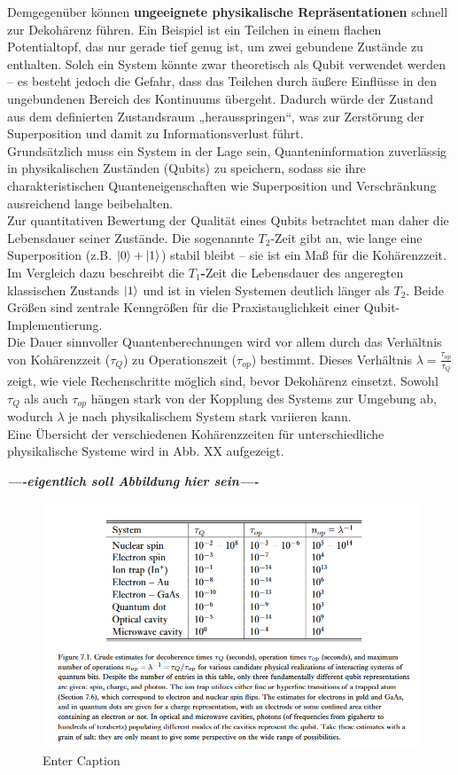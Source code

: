 Demgegenüber können \textbf{ungeeignete physikalische Repräsentationen} schnell zur Dekohärenz führen. Ein Beispiel ist ein Teilchen in einem flachen Potentialtopf, das nur gerade tief genug ist, um zwei gebundene Zustände zu enthalten. Solch ein System könnte zwar theoretisch als Qubit verwendet werden – es besteht jedoch die Gefahr, dass das Teilchen durch äußere Einflüsse in den ungebundenen Bereich des Kontinuums übergeht. Dadurch würde der Zustand aus dem definierten Zustandsraum „herausspringen“, was zur Zerstörung der Superposition und damit zu Informationsverlust führt.\\

Grundsätzlich muss ein System in der Lage sein, Quanteninformation zuverlässig in physikalischen Zuständen (Qubits) zu speichern, sodass sie ihre charakteristischen Quanteneigenschaften wie Superposition und Verschränkung ausreichend lange beibehalten. \\
Zur quantitativen Bewertung der Qualität eines Qubits betrachtet man daher die Lebensdauer seiner Zustände. Die sogenannte \textbf{$T_2$}-Zeit gibt an, wie lange eine Superposition (z.B. 
$\ket{0} + \ket{1}$) stabil bleibt – sie ist ein Maß für die Kohärenzzeit. \\
Im Vergleich dazu beschreibt die \textbf{$T_1$-}Zeit die Lebensdauer des angeregten klassischen Zustands $\ket{1}$ und ist in vielen Systemen deutlich länger als $T_2$. Beide Größen sind zentrale Kenngrößen für die Praxistauglichkeit einer Qubit-Implementierung.\\

Die Dauer sinnvoller Quantenberechnungen wird vor allem durch das Verhältnis von Kohärenzzeit (\(\tau_Q\)) zu Operationszeit (\(\tau_{op}\)) bestimmt. Dieses Verhältnis 
\(\lambda = \frac{\tau_{op}}{\tau_Q}\) zeigt, wie viele Rechenschritte möglich sind, bevor Dekohärenz einsetzt. Sowohl \(\tau_Q\) als auch \(\tau_{op}\) hängen stark von der Kopplung des Systems zur Umgebung ab, wodurch \(\lambda\) je nach physikalischem System stark variieren kann. \\

Eine Übersicht der verschiedenen Kohärenzzeiten für unterschiedliche physikalische Systeme wird in Abb. XX aufgezeigt. 

\textbf{\textit{----eigentlich soll Abbildung hier sein----}}

\begin{figure}
    \centering
    \includegraphics[width=0.5\linewidth]{images/physics/uebersicht_physikalische_realisierung.png}
    \caption{Enter Caption}
    \label{fig:enter-label}
\end{figure}
 

